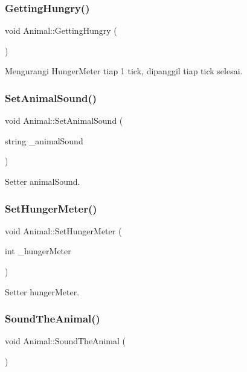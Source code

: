 \subsubsection{\texorpdfstring{GettingHungry()}{GettingHungry()}}
{\footnotesize\ttfamily void Animal\+::\+Getting\+Hungry (\begin{DoxyParamCaption}{ }\end{DoxyParamCaption})}



Mengurangi Hunger\+Meter tiap 1 tick, dipanggil tiap tick selesai. 

\mbox{\label{classAnimal_af8fdb2bbb3d2ae4d1f70b850a71e42ab}} 
\subsubsection{\texorpdfstring{SetAnimalSound()}{SetAnimalSound()}}
{\footnotesize\ttfamily void Animal\+::\+Set\+Animal\+Sound (\begin{DoxyParamCaption}\item[{string}]{\+\_\+animal\+Sound }\end{DoxyParamCaption})}



Setter animal\+Sound. 

\mbox{\label{classAnimal_a4d6894b8b33ce7cf3d6dc42c64f06b76}} 
\subsubsection{\texorpdfstring{SetHungerMeter()}{SetHungerMeter()}}
{\footnotesize\ttfamily void Animal\+::\+Set\+Hunger\+Meter (\begin{DoxyParamCaption}\item[{int}]{\+\_\+hunger\+Meter }\end{DoxyParamCaption})}



Setter hunger\+Meter. 

\mbox{\label{classAnimal_a133f57a24e15741829d677c2602effd2}} 
\subsubsection{\texorpdfstring{SoundTheAnimal()}{SoundTheAnimal()}}
{\footnotesize\ttfamily void Animal\+::\+Sound\+The\+Animal (\begin{DoxyParamCaption}{ }\end{DoxyParamCaption})}



